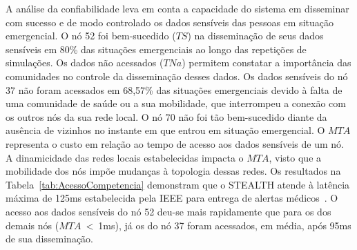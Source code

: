 \documentclass[12pt]{article}
\newcommand{\agn}[1]{\textcolor{auburn}{#1}}
\begin{document}
A análise da confiabilidade leva em conta a capacidade do sistema em disseminar com sucesso e de modo controlado os dados sensíveis das pessoas em situação emergencial. O nó 52 foi bem-sucedido ($TS$) na disseminação de seus dados sensíveis em 80\% das situações emergenciais ao longo das repetições de simulações.
\agn{Os dados não acessados ($TNa$) permitem constatar a}
importância das comunidades no controle da disseminação desses dados.
Os dados sensíveis do nó 37 não foram acessados em 68,57\% das situações emergenciais
\agn{devido}
à falta de uma comunidade de saúde
ou a sua mobilidade, que interrompeu a conexão com os outros nós da sua rede local. O nó 70 não foi tão bem-sucedido
\agn{diante da ausência}
de vizinhos no instante em que
entrou em situação emergencial.
O
$MTA$
representa o custo em relação ao tempo de acesso aos dados sensíveis de um nó.
A dinamicidade das redes locais estabelecidas impacta o \textbf{$MTA$}, visto que a mobilidade dos nós impõe mudanças à topologia dessas redes. Os resultados na Tabela~\ref{tab:AcessoCompetencia} demonstram que o \mbox{STEALTH}
\agn{atende}
à latência máxima de 125ms estabelecida pela IEEE para entrega de alertas médicos~\cite{ieee2012}. O acesso aos dados sensíveis do nó 52 deu-se mais rapidamente que para os dos demais nós ($MTA$~<~1ms), já os do nó 37 foram acessados, em média, após 95ms de sua disseminação. 
\end{document}
